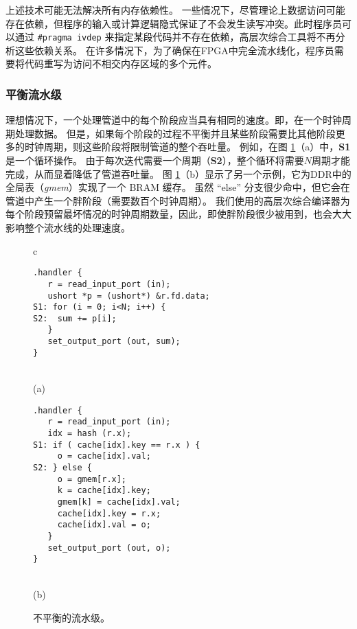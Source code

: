 上述技术可能无法解决所有内存依赖性。
一些情况下，尽管理论上数据访问可能存在依赖，但程序的输入或计算逻辑隐式保证了不会发生读写冲突。此时程序员可以通过 \texttt{\#pragma ivdep} 来指定某段代码并不存在依赖，高层次综合工具将不再分析这些依赖关系。
在许多情况下，为了确保在FPGA中完全流水线化，程序员需要将代码重写为访问不相交内存区域的多个元件。


\subsubsection{平衡流水级}
理想情况下，一个处理管道中的每个阶段应当具有相同的速度。即，在一个时钟周期处理数据。
但是，如果每个阶段的过程不平衡并且某些阶段需要比其他阶段更多的时钟周期，则这些阶段将限制管道的整个吞吐量。
例如，在图 \ref {clicknp:fig:unbalance}（a）中，\textbf {S1}是一个循环操作。
由于每次迭代需要一个周期（\textbf {S2}），整个循环将需要$N$周期才能完成，从而显着降低了管道吞吐量。
图 \ref {clicknp:fig:unbalance}（b）显示了另一个示例，它为DDR中的全局表（\textit {gmem}）实现了一个 BRAM 缓存。
虽然 ``else'' 分支很少命中，但它会在管道中产生一个胖阶段（需要数百个时钟周期）。
我们使用的高层次综合编译器为每个阶段预留最坏情况的时钟周期数量，因此，即使胖阶段很少被用到，也会大大影响整个流水线的处理速度。

\begin{figure}
\lstset{style=numbers}

\centering

\begin{tabular}{c}
{
\small
\begin{lstlisting}[escapechar=@]
.handler {
   r = read_input_port (in);
   ushort *p = (ushort*) &r.fd.data;
S1: for (i = 0; i<N; i++) {
S2:  sum += p[i];
   }
   set_output_port (out, sum);
}
\end{lstlisting} 
} \\
(a) \vspace{3pt} \\
{
\small 
\begin{lstlisting}[escapechar=@]
.handler {
   r = read_input_port (in);
   idx = hash (r.x);
S1: if ( cache[idx].key == r.x ) {
     o = cache[idx].val;
S2: } else {
     o = gmem[r.x];
     k = cache[idx].key;
     gmem[k] = cache[idx].val;
     cache[idx].key = r.x;
     cache[idx].val = o;
   }
   set_output_port (out, o);
}
\end{lstlisting} 
} \\
(b) \vspace{3pt} 
\end{tabular}

\caption{不平衡的流水级。}
\label{clicknp:fig:unbalance}

\end{figure}


